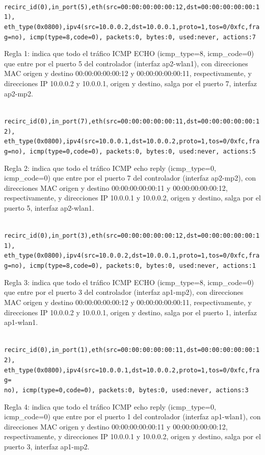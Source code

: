 \documentclass[a4paper,12pt,twoside,spanish]{book}
\begin{document}
\noindent\texttt{
	recirc\_id(0),in\_port(5),eth(src=00:00:00:00:00:12,dst=00:00:00:00:00:11),
	eth\_type(0x0800),ipv4(src=10.0.0.2,dst=10.0.0.1,proto=1,tos=0/0xfc,frag=no),
	icmp(type=8,code=0), packets:0, bytes:0, 	used:never, actions:7
}

Regla 1: indica que todo el tráfico ICMP ECHO (icmp\_type=8, icmp\_code=0) que entre por el puerto 5 del controlador (interfaz ap2-wlan1), con direcciones MAC origen y destino 00:00:00:00:00:12 y 00:00:00:00:00:11, respectivamente, y direcciones IP 10.0.0.2 y 10.0.0.1, origen y destino, salga por el puerto 7, interfaz ap2-mp2.\par 

\noindent\texttt{
	recirc\_id(0),in\_port(7),eth(src=00:00:00:00:00:11,dst=00:00:00:00:00:12),
	eth\_type(0x0800),ipv4(src=10.0.0.1,dst=10.0.0.2,proto=1,tos=0/0xfc,frag=no),
	icmp(type=0,code=0), packets:0, bytes:0, 	used:never, actions:5
}

Regla 2: indica que todo el tráfico ICMP echo reply (icmp\_type=0, icmp\_code=0) que entre por el puerto 7 del controlador (interfaz ap2-mp2), con direcciones MAC origen y destino 00:00:00:00:00:11 y 00:00:00:00:00:12, respectivamente, y direcciones IP 10.0.0.1 y 10.0.0.2, origen y destino, salga por el puerto 5, interfaz ap2-wlan1.\par 

\noindent\texttt{
	recirc\_id(0),in\_port(3),eth(src=00:00:00:00:00:12,dst=00:00:00:00:00:11),
	eth\_type(0x0800),ipv4(src=10.0.0.2,dst=10.0.0.1,proto=1,tos=0/0xfc,frag=no),
	icmp(type=8,code=0), packets:0, bytes:0, 	used:never, actions:1
}

Regla 3: indica que todo el tráfico ICMP ECHO (icmp\_type=8, icmp\_code=0) que entre por el puerto 3 del controlador (interfaz ap1-mp2), con direcciones MAC origen y destino 00:00:00:00:00:12 y 00:00:00:00:00:11, respectivamente, y direcciones IP 10.0.0.2 y 10.0.0.1, origen y destino, salga por el puerto 1, interfaz ap1-wlan1.\par 


\noindent\texttt{
	recirc\_id(0),in\_port(1),eth(src=00:00:00:00:00:11,dst=00:00:00:00:00:12),
	eth\_type(0x0800),ipv4(src=10.0.0.1,dst=10.0.0.2,proto=1,tos=0/0xfc,frag=\\no),
	icmp(type=0,code=0), packets:0, bytes:0, 	used:never, actions:3
}

Regla 4: indica que todo el tráfico ICMP echo reply (icmp\_type=0, icmp\_code=0) que entre por el puerto 1 del controlador (interfaz ap1-wlan1), con direcciones MAC origen y destino 00:00:00:00:00:11 y 00:00:00:00:00:12, respectivamente, y direcciones IP 10.0.0.1 y 10.0.0.2, origen y destino, salga por el puerto 3, interfaz ap1-mp2.\par 
\end{document}
